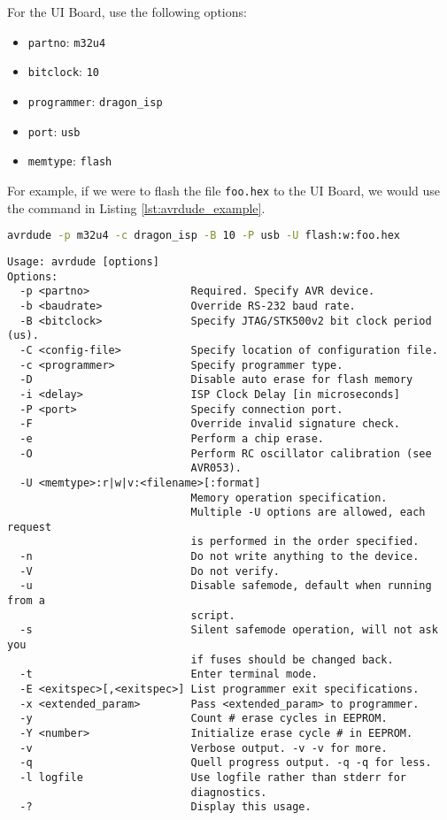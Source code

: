 \documentclass{report}
\begin{document}
				For the UI Board, use the following options:

				\begin{itemize}
					\item \lstinline{partno}: \lstinline{m32u4}
					\item \lstinline{bitclock}: \lstinline{10}
					\item \lstinline{programmer}: \lstinline{dragon_isp}
					\item \lstinline{port}: \lstinline{usb}
					\item \lstinline{memtype}: \lstinline{flash}
				\end{itemize}
				
				For example, if we were to flash the file \lstinline{foo.hex} to the UI Board, we would use the command in Listing \ref{lst:avrdude_example}.

				\begin{lstlisting}[language=sh, caption={Example avrdude command}, label={lst:avrdude_example}]
avrdude -p m32u4 -c dragon_isp -B 10 -P usb -U flash:w:foo.hex
				\end{lstlisting}

				\begin{lstlisting}[caption={\lstinline{avrdude} usage}, label={lst:avrdude_usage}]
Usage: avrdude [options]
Options:
  -p <partno>                Required. Specify AVR device.
  -b <baudrate>              Override RS-232 baud rate.
  -B <bitclock>              Specify JTAG/STK500v2 bit clock period (us).
  -C <config-file>           Specify location of configuration file.
  -c <programmer>            Specify programmer type.
  -D                         Disable auto erase for flash memory
  -i <delay>                 ISP Clock Delay [in microseconds]
  -P <port>                  Specify connection port.
  -F                         Override invalid signature check.
  -e                         Perform a chip erase.
  -O                         Perform RC oscillator calibration (see 
                             AVR053). 
  -U <memtype>:r|w|v:<filename>[:format]
                             Memory operation specification.
                             Multiple -U options are allowed, each request
                             is performed in the order specified.
  -n                         Do not write anything to the device.
  -V                         Do not verify.
  -u                         Disable safemode, default when running from a
                             script.
  -s                         Silent safemode operation, will not ask you 
                             if fuses should be changed back.
  -t                         Enter terminal mode.
  -E <exitspec>[,<exitspec>] List programmer exit specifications.
  -x <extended_param>        Pass <extended_param> to programmer.
  -y                         Count # erase cycles in EEPROM.
  -Y <number>                Initialize erase cycle # in EEPROM.
  -v                         Verbose output. -v -v for more.
  -q                         Quell progress output. -q -q for less.
  -l logfile                 Use logfile rather than stderr for 
                             diagnostics.
  -?                         Display this usage.
				\end{lstlisting}
\end{document}

